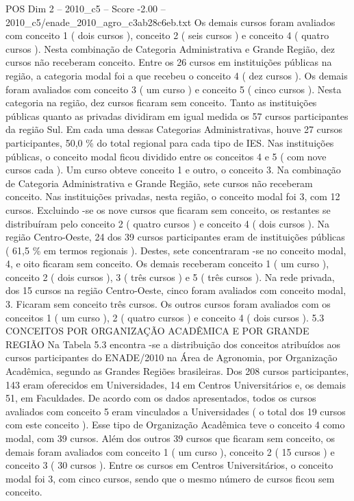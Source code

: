 \begin{textsample}{POS Dim 2 – 2010\_c5 – Score -2.00 – 2010\_c5/enade\_2010\_agro\_c3ab28c6eb.txt}
Os demais cursos foram avaliados com conceito 1 ( dois cursos ), conceito 2 ( seis cursos ) e conceito 4 ( quatro cursos ).
Nesta combinação de Categoria Administrativa e Grande Região, dez cursos não receberam conceito.
Entre os 26 cursos em instituições públicas na região, a categoria modal foi a que recebeu o conceito 4 ( dez cursos ).
Os demais foram avaliados com conceito 3 ( um curso ) e conceito 5 ( cinco cursos ).
Nesta categoria na região, dez cursos ficaram sem conceito.
Tanto as instituições públicas quanto as privadas dividiram em igual medida os 57 cursos participantes da região Sul.
Em cada uma dessas Categorias Administrativas, houve 27 cursos participantes, 50,0 \% do total regional para cada tipo de IES.
Nas instituições públicas, o conceito modal ficou dividido entre os conceitos 4 e 5 ( com nove cursos cada ).
Um curso obteve conceito 1 e outro, o conceito 3.
Na combinação de Categoria Administrativa e Grande Região, sete cursos não receberam conceito.
Nas instituições privadas, nesta região, o conceito modal foi 3, com 12 cursos.
Excluindo -se os nove cursos que ficaram sem conceito, os restantes se distribuíram pelo conceito 2 ( quatro cursos ) e conceito 4 ( dois cursos ).
Na região Centro-Oeste, 24 dos 39 cursos participantes eram de instituições públicas ( 61,5 \% em termos regionais ).
Destes, sete concentraram -se no conceito modal, 4, e oito ficaram sem conceito.
Os demais receberam conceito 1 ( um curso ), conceito 2 ( dois cursos ), 3 ( três cursos ) e 5 ( três cursos ).
Na rede privada, dos 15 cursos na região Centro-Oeste, cinco foram avaliados com conceito modal, 3.
Ficaram sem conceito três cursos.
Os outros cursos foram avaliados com os conceitos 1 ( um curso ), 2 ( quatro cursos ) e conceito 4 ( dois cursos ). 5.3 CONCEITOS POR ORGANIZAÇÃO ACADÊMICA E POR GRANDE REGIÃO Na Tabela 5.3 encontra -se a distribuição dos conceitos atribuídos aos cursos participantes do ENADE/2010 na Área de Agronomia, por Organização Acadêmica, segundo as Grandes Regiões brasileiras.
Dos 208 cursos participantes, 143 eram oferecidos em Universidades, 14 em Centros Universitários e, os demais 51, em Faculdades.
De acordo com os dados apresentados, todos os cursos avaliados com conceito 5 eram vinculados a Universidades ( o total dos 19 cursos com este conceito ).
Esse tipo de Organização Acadêmica teve o conceito 4 como modal, com 39 cursos.
Além dos outros 39 cursos que ficaram sem conceito, os demais foram avaliados com conceito 1 ( um curso ), conceito 2 ( 15 cursos ) e conceito 3 ( 30 cursos ).
Entre os cursos em Centros Universitários, o conceito modal foi 3, com cinco cursos, sendo que o mesmo número de cursos ficou sem conceito.

\end{textsample}
